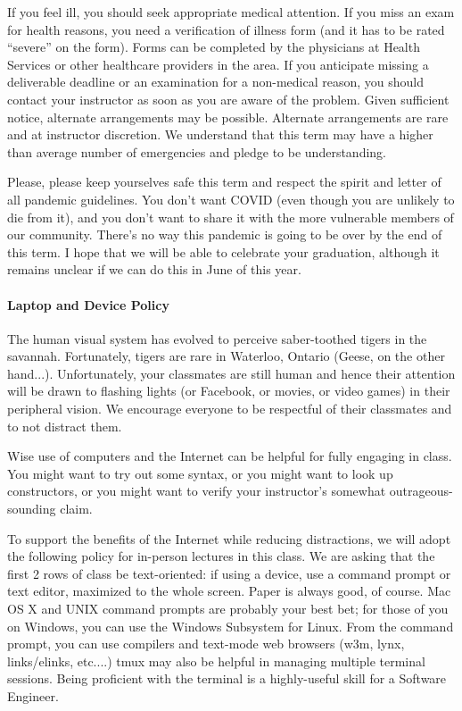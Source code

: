 \documentclass[letterpaper,10pt]{article}
\begin{document}

If you feel ill, you should seek appropriate medical attention. If you miss an exam for health reasons, you need a verification of illness form (and it has to be rated ``severe'' on the form). Forms can be completed by the physicians at Health Services or other healthcare providers in the area. If you anticipate missing a deliverable deadline or an examination for a non-medical reason, you should contact your instructor as soon as you are aware of the problem. Given sufficient notice, alternate arrangements may be possible. Alternate arrangements are rare and at instructor discretion. We understand that this term may have a higher than average number of emergencies and pledge to be understanding.

Please, please keep yourselves safe this term and respect the spirit and letter of all pandemic guidelines. You don't want COVID (even though you are unlikely to die from it), and you don't want to share it with the more vulnerable members of our community. There's no way this pandemic is going to be over by the end of this term. I hope that we will be able to celebrate your graduation, although it remains unclear if we can do this in June of this year. 

\paragraph{Laptop and Device Policy}
The human visual system has evolved to perceive saber-toothed tigers
in the savannah. Fortunately, tigers are rare in Waterloo, Ontario
(Geese, on the other hand...).
Unfortunately, your classmates are still human and hence their
attention will be drawn to flashing lights (or Facebook, or movies, or
video games) in their peripheral vision. We encourage
everyone to be respectful of their classmates and to not distract them.

Wise use of computers and the Internet can be helpful for fully
engaging in class. You might want to try out some syntax, or you might
want to look up constructors, or you might want to verify your
instructor's somewhat outrageous-sounding claim.

To support the benefits of the Internet while reducing distractions,
we will adopt the following policy for in-person lectures in this class. We are asking that the
first 2 rows of class be text-oriented: if using a device, use a
command prompt or text editor, maximized to the whole screen. Paper is
always good, of course. Mac OS X and UNIX command prompts are probably
your best bet; for those of you on Windows, you can use the Windows
Subsystem for Linux. From the command prompt, you can use compilers
and text-mode web browsers (w3m, lynx, links/elinks, etc....) tmux may
also be helpful in managing multiple terminal sessions. Being
proficient with the terminal is a highly-useful skill for a Software
Engineer.
\end{document}
